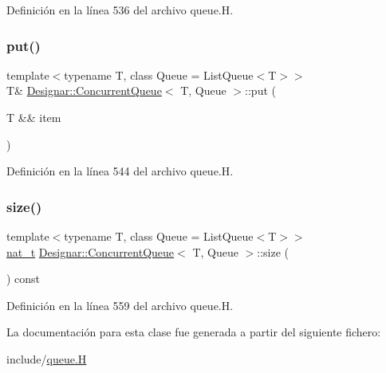 Definición en la línea 536 del archivo queue.\+H.

\mbox{\label{class_designar_1_1_concurrent_queue_aacc6c771061780c42058303f300b5acb}} 
\subsubsection{\texorpdfstring{put()}{put()}\hspace{0.1cm}{\footnotesize\ttfamily [2/2]}}
{\footnotesize\ttfamily template$<$typename T, class Queue = List\+Queue$<$\+T$>$$>$ \\
T\& \hyperlink{class_designar_1_1_concurrent_queue}{Designar\+::\+Concurrent\+Queue}$<$ T, Queue $>$\+::put (\begin{DoxyParamCaption}\item[{T \&\&}]{item }\end{DoxyParamCaption})\hspace{0.3cm}{\ttfamily [inline]}}



Definición en la línea 544 del archivo queue.\+H.

\mbox{\label{class_designar_1_1_concurrent_queue_acbeaea381f53471ea17366ab7a5fc52d}} 
\subsubsection{\texorpdfstring{size()}{size()}}
{\footnotesize\ttfamily template$<$typename T, class Queue = List\+Queue$<$\+T$>$$>$ \\
\hyperlink{namespace_designar_aa72662848b9f4815e7bf31a7cf3e33d1}{nat\+\_\+t} \hyperlink{class_designar_1_1_concurrent_queue}{Designar\+::\+Concurrent\+Queue}$<$ T, Queue $>$\+::size (\begin{DoxyParamCaption}{ }\end{DoxyParamCaption}) const\hspace{0.3cm}{\ttfamily [inline]}}



Definición en la línea 559 del archivo queue.\+H.



La documentación para esta clase fue generada a partir del siguiente fichero\+:\begin{DoxyCompactItemize}
\item 
include/\hyperlink{queue_8_h}{queue.\+H}\end{DoxyCompactItemize}
